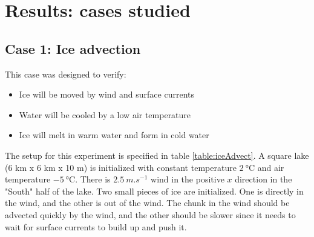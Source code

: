 \documentclass[11pt]{article}
\begin{document}
\section{Results: cases studied}

\subsection{Case 1: Ice advection}
This case was designed to verify:
\begin{itemize}
\item{Ice will be moved by wind and surface currents}
\item{Water will be cooled by a low air temperature}
\item{Ice will melt in warm water and form in cold water}
\end{itemize}
The setup for this experiment is specified in table \ref{table:iceAdvect}. A square lake (6 km x 6 km x 10 m) is initialized with constant temperature $\SI{2}{\celsius}$ and air temperature $\SI{-5}{\celsius}$. There is $\SI{2.5}{m.s^{-1}}$ wind in the positive $x$ direction in the "South" half of the lake. Two small pieces of ice are initialized. One is directly in the wind, and the other is out of the wind. The chunk in the wind should be advected quickly by the wind, and the other should be slower since it needs to wait for surface currents to build up and push it.
\end{document}
